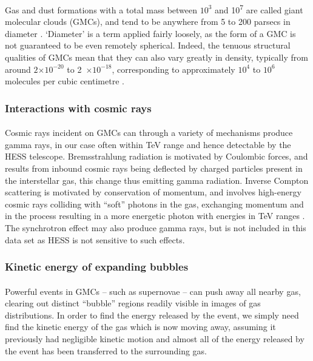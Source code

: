 \documentclass[a4paper, titlepage, oneside]{article}
\newcommand{\e}[1]{\ensuremath{\times 10^{#1}}}
\newcommand{\smass}{\mathrm{M_\odot}}
\begin{document}
\begin{multicols}{2}
Gas and dust formations with a total mass between \(10^3\) and \unit{10^7}{\smass} are called giant molecular clouds (GMCs), and tend to be anywhere from 5 to 200 parsecs in diameter \parencite{Murray:2011}. `Diameter' is a term applied fairly loosely, as the form of a GMC is not guaranteed to be even remotely spherical. Indeed, the tenuous structural qualities of GMCs mean that they can also vary greatly in density, typically from around \(2\e{-20}\) to \unit{2\e{-18}}{\gram\usk\centi\metre\rpcubed}, corresponding to approximately \(10^4\) to \(10^6\) molecules per cubic centimetre \parencite{Ferriere:2001}.

\subsubsection{Interactions with cosmic rays}
\paragraph{}
Cosmic rays incident on GMCs can through a variety of mechanisms produce gamma rays, in our case often within TeV range and hence detectable by the HESS telescope. Bremsstrahlung radiation is motivated by Coulombic forces, and results from inbound cosmic rays being deflected by charged particles present in the interstellar gas, this change thus emitting gamma radiation. Inverse Compton scattering is motivated by conservation of momentum, and involves high-energy cosmic rays colliding with ``soft'' photons in the gas, exchanging momentum and in the process resulting in a more energetic photon with energies in TeV ranges \parencite{Ferriere:2001}. The synchrotron effect may also produce gamma rays, but is not included in this data set as HESS is not sensitive to such effects.

\subsubsection{Kinetic energy of expanding bubbles}
\label{sec:kinetic}
\paragraph{}
Powerful events in GMCs -- such as supernovae -- can push away all nearby gas, clearing out distinct ``bubble'' regions readily visible in images of gas distributions. In order to find the energy released by the event, we simply need find the kinetic energy of the gas which is now moving away, assuming it previously had negligible kinetic motion and almost all of the energy released by the event has been transferred to the surrounding gas.


\end{multicols}
\end{document}
